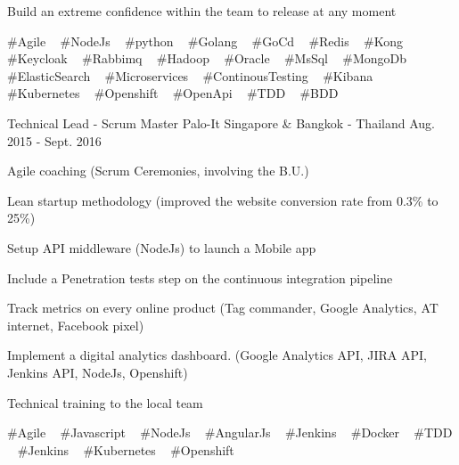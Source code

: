 \begin{cventries}
{\begin{cvitems}
        \item {Build an extreme confidence within the team to release at any moment}
      \end{cvitems}
    }
    {
      \#Agile ~
      \#NodeJs ~
      \#python ~
      \#Golang ~
      \#GoCd ~
      \#Redis ~
      \#Kong ~
      \#Keycloak ~
      \#Rabbimq ~
      \#Hadoop ~
      \#Oracle ~
      \#MsSql ~
      \#MongoDb ~
      \#ElasticSearch ~
      \#Microservices ~
      \#ContinousTesting ~
      \#Kibana ~
      \#Kubernetes ~
      \#Openshift ~
      \#OpenApi ~
      \#TDD ~
      \#BDD
    }

  \cventry
    {Technical Lead - Scrum Master} %
    {Palo-It} %
    {Singapore \& Bangkok - Thailand} %
    {Aug. 2015 - Sept. 2016} %
    {
      \begin{cvitems} %
        \item {Agile coaching (Scrum Ceremonies, involving the B.U.)}
        \item {Lean startup methodology (improved the website conversion rate from 0.3\% to 25\%) }
        \item {Setup API middleware (NodeJs) to launch a Mobile app}
        \item {Include a Penetration tests step on the continuous integration pipeline}
        \item {Track metrics on every online product (Tag commander, Google Analytics, AT internet, Facebook pixel)}
        \item {Implement a digital analytics dashboard. (Google Analytics API, JIRA API, Jenkins API, NodeJs, Openshift)}
        \item {Technical training to the local team}
      \end{cvitems}
    }
    {
      \#Agile ~
      \#Javascript ~
      \#NodeJs ~
      \#AngularJs ~
      \#Jenkins ~
      \#Docker ~
      \#TDD ~
      \#Jenkins ~
      \#Kubernetes ~
      \#Openshift
    }


\end{cventries}
